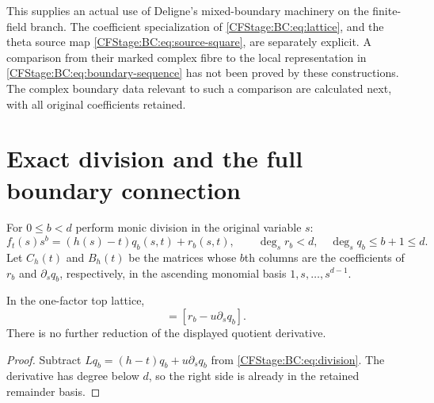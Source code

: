 This supplies an actual use of Deligne's mixed-boundary machinery on
the finite-field branch.  The coefficient specialization of
\eqref{CFStage:BC:eq:lattice}, and the theta source map
\eqref{CFStage:BC:eq:source-square}, are separately explicit.  A comparison from
their marked complex fibre to the local representation in
\eqref{CFStage:BC:eq:boundary-sequence} has not been proved by these constructions.
The complex boundary data relevant to such a comparison are calculated
next, with all original coefficients retained.

\section{Exact division and the full boundary connection}

For $0\le b<d$ perform monic division in the original variable $s$:
\begin{equation}
 f_t(s)s^b=(h(s)-t)q_b(s,t)+r_b(s,t),\qquad
 \deg_s r_b<d,\quad \deg_s q_b\le b+1\le d.
 \label{CFStage:BC:eq:division}
\end{equation}
Let $C_h(t)$ and $B_h(t)$ be the matrices whose $b$th columns are the
coefficients of $r_b$ and $\partial_s q_b$, respectively, in the
ascending monomial basis $1,s,\ldots,s^{d-1}$.

\begin{lemma}
In the one-factor top lattice,
\begin{equation}
 [f_t s^b]=[r_b-u\partial_s q_b].
 \label{CFStage:BC:eq:reduction}
\end{equation}
There is no further reduction of the displayed quotient derivative.
\end{lemma}
\begin{proof}
Subtract $Lq_b=(h-t)q_b+u\partial_s q_b$ from
\eqref{CFStage:BC:eq:division}.  The derivative has degree below $d$, so the
right side is already in the retained remainder basis.
\end{proof}

